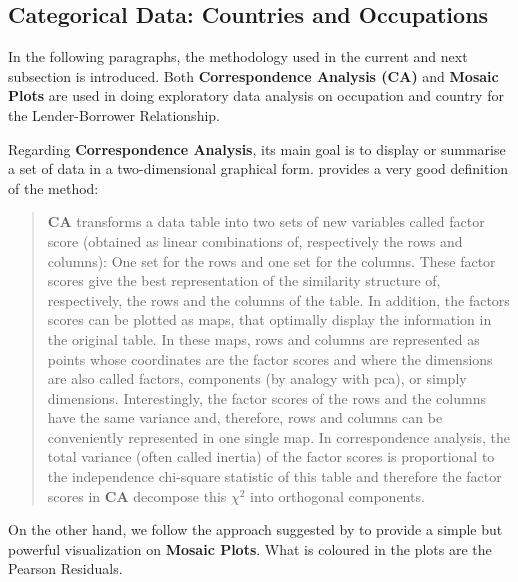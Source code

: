 \subsection{Categorical Data: Countries and Occupations}
In the following paragraphs, the methodology used in the current and next subsection is introduced. Both \textbf{Correspondence Analysis (CA)} and \textbf{Mosaic Plots} are used in doing exploratory data analysis on occupation and country for the Lender-Borrower Relationship. \par
Regarding  \textbf{Correspondence Analysis}, its main goal is to display or summarise a set of data in a two-dimensional graphical form. \textcite{Nagpaul1999} provides a very good definition of the method:
\blockquote{
\textbf{CA} transforms a data table into two sets of new variables called factor score (obtained as linear combinations of, respectively the rows and columns): One set for the rows and one set for the columns. These factor scores give the best representation of the similarity structure of, respectively, the rows and the columns of the table. In addition, the factors scores can be plotted as maps, that optimally display the information in the original table. In these maps, rows and columns are represented as points whose coordinates are the factor scores and where the dimensions are also called factors, components (by analogy with pca), or simply dimensions. Interestingly, the factor scores of the rows and the columns have the same variance and, therefore, rows and columns can be conveniently represented in one single map.
In correspondence analysis, the total variance (often called inertia) of the factor
scores is proportional to the independence chi-square statistic of this table and therefore the factor scores in \textbf{CA} decompose this $\chi^2$ into orthogonal components.}
\par
On the other hand, we follow the approach suggested by \textcite{Zeileis2007} to provide a simple but powerful visualization on \textbf{Mosaic Plots}. What is coloured in the plots are the Pearson Residuals.\par
